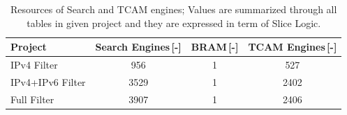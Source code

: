 \begin{table}[h]
    \centering
    \begin{tabular}{|l||c|c||c|}
    	\hline
    	\T \textbf{Project} & \textbf{Search Engines\,[-]} & \textbf{BRAM\,[-]} & \textbf{TCAM Engines\,[-]} \\ \hline\hline
    	\T IPv4 Filter      &             956              &         1          &            527             \\
    	IPv4+IPv6 Filter    &             3529             &         1          &            2402            \\
    	Full Filter         &             3907             &         1          &            2406            \\ \hline
    \end{tabular}
    \caption{Resources of Search and TCAM engines; Values are summarized through all tables in given project and they are expressed 
        in term of Slice Logic.}
    \label{tab:resourcesTcamAndSearchEngine}
\end{table}

%
%

